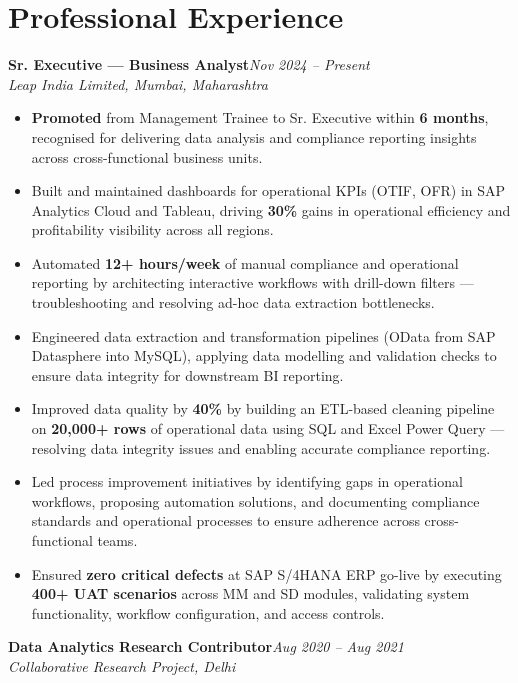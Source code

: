 \documentclass[10pt, letterpaper]{article}
\newcommand{\role}[3]{%
  \vspace{2pt}%
  {\bfseries #1}\hfill{\small\color{muted}\textit{#3}}\\[-2pt]%
  {\small\color{muted}\textit{#2}}%
}
\begin{document}
\section{Professional Experience}

\role{Sr. Executive — Business Analyst}{Leap India Limited, Mumbai, Maharashtra}{Nov 2024 – Present}

\begin{itemize}
  \item \textbf{Promoted} from Management Trainee to Sr. Executive within \textbf{6 months}, recognised for delivering data analysis and compliance reporting insights across cross-functional business units.
  \item Built and maintained dashboards for operational KPIs (OTIF, OFR) in SAP Analytics Cloud and Tableau, driving \textbf{30\%} gains in operational efficiency and profitability visibility across all regions.
  \item Automated \textbf{12+ hours/week} of manual compliance and operational reporting by architecting interactive workflows with drill-down filters — troubleshooting and resolving ad-hoc data extraction bottlenecks.
  \item Engineered data extraction and transformation pipelines (OData from SAP Datasphere into MySQL), applying data modelling and validation checks to ensure data integrity for downstream BI reporting.
  \item Improved data quality by \textbf{40\%} by building an ETL-based cleaning pipeline on \textbf{20,000+ rows} of operational data using SQL and Excel Power Query — resolving data integrity issues and enabling accurate compliance reporting.
  \item Led process improvement initiatives by identifying gaps in operational workflows, proposing automation solutions, and documenting compliance standards and operational processes to ensure adherence across cross-functional teams.
  \item Ensured \textbf{zero critical defects} at SAP S/4HANA ERP go-live by executing \textbf{400+ UAT scenarios} across MM and SD modules, validating system functionality, workflow configuration, and access controls.
\end{itemize}

\vspace{1pt}

\role{Data Analytics Research Contributor}{Collaborative Research Project, Delhi}{Aug 2020 – Aug 2021}
\end{document}

